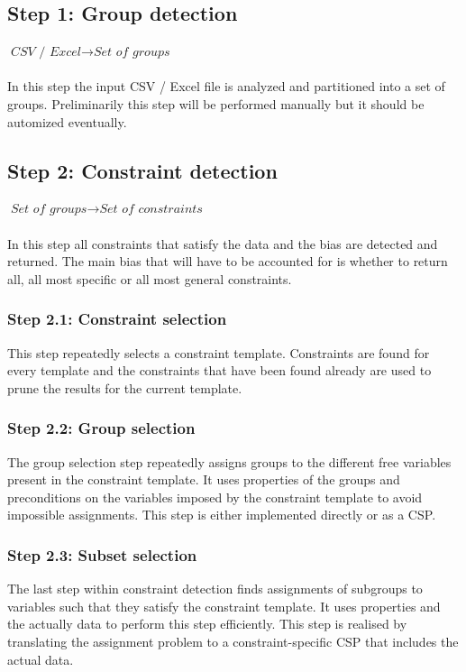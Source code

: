 \documentclass[a4paper]{article}
\begin{document}
\subsection*{Step 1: Group detection}
$\textit{CSV / Excel} \rightarrow \textit{Set of groups}$\\\\
In this step the input CSV / Excel file is analyzed and partitioned into a set of groups.
Preliminarily this step will be performed manually but it should be automized eventually.

\subsection*{Step 2: Constraint detection}
$\textit{Set of groups} \rightarrow \textit{Set of constraints}$\\\\
In this step all constraints that satisfy the data and the bias are detected and returned.
The main bias that will have to be accounted for is whether to return all, all most specific or all most general constraints.

\subsubsection*{Step 2.1: Constraint selection}
This step repeatedly selects a constraint template.
Constraints are found for every template and the constraints that have been found already are used to prune the results for the current template.

\subsubsection*{Step 2.2: Group selection}
The group selection step repeatedly assigns groups to the different free variables present in the constraint template.
It uses properties of the groups and preconditions on the variables imposed by the constraint template to avoid impossible assignments.
This step is either implemented directly or as a CSP.

\subsubsection*{Step 2.3: Subset selection}
The last step within constraint detection finds assignments of subgroups to variables such that they satisfy the constraint template.
It uses properties and the actually data to perform this step efficiently.
This step is realised by translating the assignment problem to a constraint-specific CSP that includes the actual data.
\end{document}
